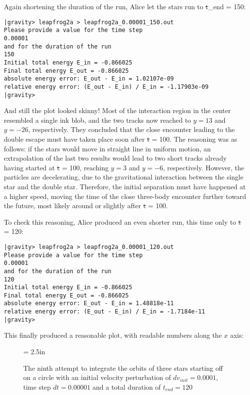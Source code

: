 Again shortening the duration of the run, Alice let the stars run to
{\st t\_end = 150}:

\begin{small}
\begin{verbatim}
|gravity> leapfrog2a > leapfrog2a_0.00001_150.out
Please provide a value for the time step
0.00001
and for the duration of the run
150
Initial total energy E_in = -0.866025
Final total energy E_out = -0.866025
absolute energy error: E_out - E_in = 1.02107e-09
relative energy error: (E_out - E_in) / E_in = -1.17903e-09
|gravity>
\end{verbatim}
\end{small}

And still the plot looked skinny!  Most of the interaction region in
the center resembled a single ink blob, and the two tracks now reached
to $y=13$ and $y=-26$, respectively.  They concluded that the close
encounter leading to the double escape must have taken place soon
after {\st t = 100}.  The reasoning was as follows: if the stars would
move in straight line in uniform motion, an extrapolation of the last
two results would lead to two short tracks already having started at 
{\st t = 100}, reaching $y=3$ and $y=-6$, respectively.  However, the
particles are decelerating, due to the gravitational interaction
between the single star and the double star.  Therefore, the initial
separation must have happened at a higher speed, moving the time of
the close three-body encounter further toward the future, most likely
around or slightly after {\st t = 100}.

To check this reasoning, Alice produced an even shorter run, this time
only to {\st t = 120}:

\begin{small}
\begin{verbatim}
|gravity> leapfrog2a > leapfrog2a_0.00001_120.out
Please provide a value for the time step
0.00001
and for the duration of the run
120
Initial total energy E_in = -0.866025
Final total energy E_out = -0.866025
absolute energy error: E_out - E_in = 1.48818e-11
relative energy error: (E_out - E_in) / E_in = -1.7184e-11
|gravity>
\end{verbatim}
\end{small}

This finally produced a reasonable plot, with readable numbers along
the $x$ axis:

\begin{figure}[htb]
\begin{center}
\epsfxsize = 2.5in
\caption[Three stars on a circle, leapfrog, $dv_{init}=0.0001$, $dt = 0.00001$,
$t_{end} = 120$]
{The ninth attempt to integrate the orbits of three stars
starting off on a circle with an initial velocity perturbation of 
$dv_{init}=0.0001$, time step $dt = 0.00001$ and a total duration of
$t_{end} = 120$}
\label{fig:leap2a-0.00001-120}
\end{center}
\end{figure}

